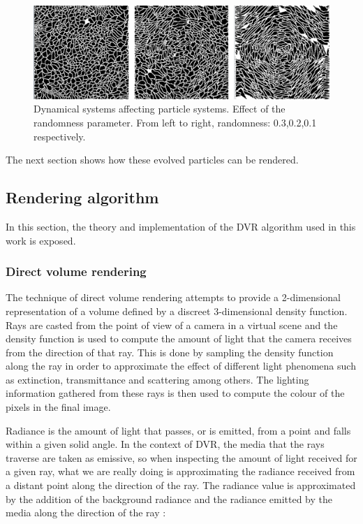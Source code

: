 \documentclass[oneside,a4paper,english,links]{amca}
\begin{document}
\begin{figure}[htb!]
  \centerline{\includegraphics[scale=0.21]{fig4}}
  \caption{Dynamical systems affecting particle systems. Effect of the randomness parameter. From left to right, randomness: 0.3,0.2,0.1 respectively. }
  \label{fg:fig4}
\end{figure}

The next section shows how these evolved particles can be rendered.

\subsection{Rendering algorithm}

In this section, the theory and implementation of the DVR algorithm used in this work is exposed.

\subsubsection{Direct volume rendering}

The technique of direct volume rendering attempts to provide a
2-dimensional representation of a volume defined by a discreet
3-dimensional density function. Rays are casted from the point of view
of a camera in a virtual scene and the density function is used to
compute the amount of light that the camera receives from the
direction of that ray. This is done by sampling the density function
along the ray in order to approximate the effect of different light
phenomena such as extinction, transmittance and scattering among
others. The lighting information gathered from these rays is then
used to compute the colour of the pixels in the final image.

Radiance is the amount of light that passes, or is emitted, from a
point and falls within a given solid angle. In the context of DVR, the
media that the rays traverse are taken as emissive, so when inspecting
the amount of light received for a given ray, what we are really doing
is approximating the radiance received from a distant point along the
direction of the ray. The radiance value is approximated by the
addition of the background radiance and the radiance emitted by the
media along the direction of the ray \citep{Kratz2006} : 
\end{document}
